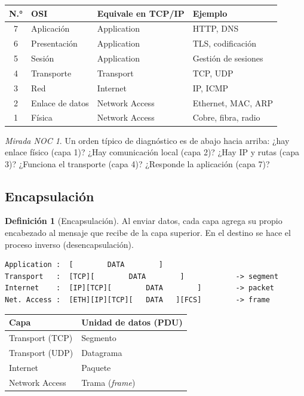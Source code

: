 \documentclass[11pt,a4paper]{article}
\theoremstyle{definition}
\newtheorem{definicion}{Definición}[section]
\theoremstyle{remark}
\newtheorem{noc}{Mirada NOC}[section]
\begin{document}
\begin{center}
\begin{tabular}{@{}clll@{}}
\toprule
\textbf{N.°} & \textbf{OSI} & \textbf{Equivale en TCP/IP} & \textbf{Ejemplo}\\
\midrule
7 & Aplicación & Application & HTTP, DNS\\
6 & Presentación & Application & TLS, codificación\\
5 & Sesión & Application & Gestión de sesiones\\
4 & Transporte & Transport & TCP, UDP\\
3 & Red & Internet & IP, ICMP\\
2 & Enlace de datos & Network Access & Ethernet, MAC, ARP\\
1 & Física & Network Access & Cobre, fibra, radio\\
\bottomrule
\end{tabular}
\end{center}

\begin{noc}
Un orden típico de diagnóstico es de abajo hacia arriba: ¿hay enlace físico (capa 1)? ¿Hay comunicación local (capa 2)? ¿Hay IP y rutas (capa 3)? ¿Funciona el transporte (capa 4)? ¿Responde la aplicación (capa 7)?
\end{noc}

\subsection{Encapsulación}

\begin{definicion}[Encapsulación]
Al enviar datos, cada capa agrega su propio encabezado al mensaje que recibe de la capa superior. En el destino se hace el proceso inverso (desencapsulación).
\end{definicion}

\begin{lstlisting}[style=console]
Application :  [        DATA        ]
Transport   :  [TCP][        DATA        ]            -> segment
Internet    :  [IP][TCP][        DATA        ]        -> packet
Net. Access :  [ETH][IP][TCP][   DATA   ][FCS]        -> frame
\end{lstlisting}

\begin{center}
\begin{tabular}{@{}ll@{}}
\toprule
\textbf{Capa} & \textbf{Unidad de datos (PDU)}\\
\midrule
Transport (TCP) & Segmento\\
Transport (UDP) & Datagrama\\
Internet & Paquete\\
Network Access & Trama (\emph{frame})\\
\bottomrule
\end{tabular}
\end{center}
\end{document}
